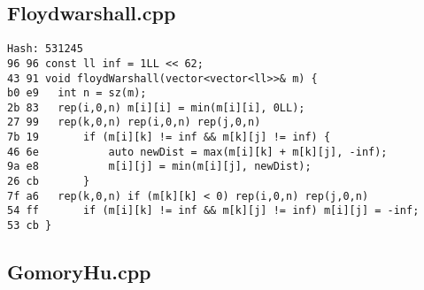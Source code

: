 \documentclass[11pt, a4paper, twoside]{article}
\begin{document}
\subsection{Floydwarshall.cpp}
\begin{lstlisting}
Hash: 531245
96 96 const ll inf = 1LL << 62;
43 91 void floydWarshall(vector<vector<ll>>& m) {
b0 e9 	int n = sz(m);
2b 83 	rep(i,0,n) m[i][i] = min(m[i][i], 0LL);
27 99 	rep(k,0,n) rep(i,0,n) rep(j,0,n)
7b 19 		if (m[i][k] != inf && m[k][j] != inf) {
46 6e 			auto newDist = max(m[i][k] + m[k][j], -inf);
9a e8 			m[i][j] = min(m[i][j], newDist);
26 cb 		}
7f a6 	rep(k,0,n) if (m[k][k] < 0) rep(i,0,n) rep(j,0,n)
54 ff 		if (m[i][k] != inf && m[k][j] != inf) m[i][j] = -inf;
53 cb }
\end{lstlisting}

\subsection{GomoryHu.cpp}
\end{document}
